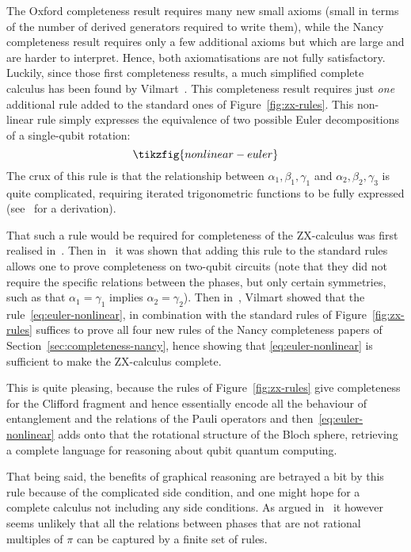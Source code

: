 \documentclass[a4paper,onecolumn,superscriptaddress,11pt,%
				unpublished,%
				allowfontchageintitle,%
				]{quantumarticle}
\begin{document}
The Oxford completeness result requires many new small axioms (small in terms of the number of derived generators required to write them), while the Nancy completeness result requires only a few additional axioms but which are large and are harder to interpret. Hence, both axiomatisations are not fully satisfactory.
Luckily, since those first completeness results, a much simplified complete calculus has been found by Vilmart~\cite{vilmarteulercompleteness}. This completeness result requires just \emph{one} additional rule added to the standard ones of Figure~\ref{fig:zx-rules}. This non-linear rule simply expresses the equivalence of two possible Euler decompositions of a single-qubit rotation:
\begin{equation}\label{eq:euler-nonlinear}
	\tikzfig{nonlinear-euler}
\end{equation}
The crux of this rule is that the relationship between $\alpha_1,\beta_1,\gamma_1$ and $\alpha_2,\beta_2,\gamma_3$ is quite complicated, requiring iterated trigonometric functions to be fully expressed (see~\cite[Section~5.3]{wang_completeness_2018} for a derivation).

That such a rule would be required for completeness of the ZX-calculus was first realised in~\cite{Witt:2014aa}. Then in~\cite{coecke2018zx} it was shown that adding this rule to the standard rules allows one to prove completeness on two-qubit circuits (note that they did not require the specific relations between the phases, but only certain symmetries, such as that $\alpha_1=\gamma_1$ implies $\alpha_2=\gamma_2$). Then in~\cite{vilmarteulercompleteness}, Vilmart showed that the rule~\eqref{eq:euler-nonlinear}, in combination with the standard rules of Figure~\ref{fig:zx-rules} suffices to prove all four new rules of the Nancy completeness papers of Section~\ref{sec:completeness-nancy}, hence showing that \eqref{eq:euler-nonlinear} is sufficient to make the ZX-calculus complete.

This is quite pleasing, because the rules of Figure~\ref{fig:zx-rules} give completeness for the Clifford fragment and hence essentially encode all the behaviour of entanglement and the relations of the Pauli operators and then~\eqref{eq:euler-nonlinear} adds onto that the rotational structure of the Bloch sphere, retrieving a complete language for reasoning about qubit quantum computing.

That being said, the benefits of graphical reasoning are betrayed a bit by this rule because of the complicated side condition, and one might hope for a complete calculus not including any side conditions. As argued in~\cite{jeandel_rational_2018,JPV-universal} it however seems unlikely that all the relations between phases that are not rational multiples of $\pi$ can be captured by a finite set of rules.
\end{document}
